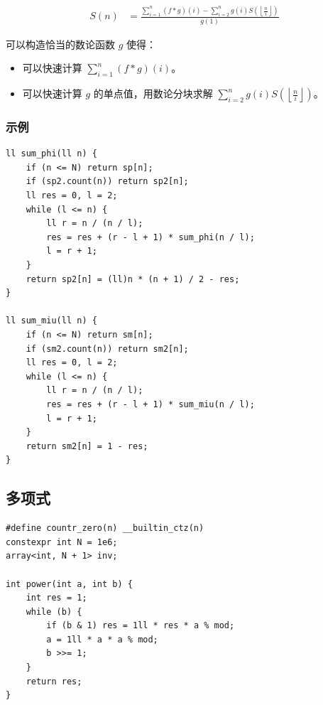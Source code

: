 \documentclass[UTF8, twoside]{ctexart}
\begin{document}
\begin{sloppypar}
$$
\begin{aligned}
    S(n) & = \frac{\sum_{i=1}^n (f * g)(i) - \sum_{i=2}^n g(i)S\left(\left\lfloor\frac{n}{i}\right\rfloor\right)}{g(1)}
\end{aligned}
$$

可以构造恰当的数论函数 $g$ 使得：

\begin{itemize}
   \item 可以快速计算 $\sum_{i=1}^n(f * g)(i)$。
   \item 可以快速计算 $g$ 的单点值，用数论分块求解 $\sum_{i=2}^ng(i)S\left(\left\lfloor\frac{n}{i}\right\rfloor\right)$。
\end{itemize}

\subsubsection{示例}

\begin{lstlisting}[style=cpp]
ll sum_phi(ll n) {
    if (n <= N) return sp[n];
    if (sp2.count(n)) return sp2[n];
    ll res = 0, l = 2;
    while (l <= n) {
        ll r = n / (n / l);
        res = res + (r - l + 1) * sum_phi(n / l);
        l = r + 1;
    }
    return sp2[n] = (ll)n * (n + 1) / 2 - res;
}

ll sum_miu(ll n) {
    if (n <= N) return sm[n];
    if (sm2.count(n)) return sm2[n];
    ll res = 0, l = 2;
    while (l <= n) {
        ll r = n / (n / l);
        res = res + (r - l + 1) * sum_miu(n / l);
        l = r + 1;
    }
    return sm2[n] = 1 - res;
}
\end{lstlisting}

\subsection{多项式}

\begin{lstlisting}[style=cpp]
#define countr_zero(n) __builtin_ctz(n)
constexpr int N = 1e6;
array<int, N + 1> inv;

int power(int a, int b) {
    int res = 1;
    while (b) {
        if (b & 1) res = 1ll * res * a % mod;
        a = 1ll * a * a % mod;
        b >>= 1;
    }
    return res;
}


\end{lstlisting}
\end{sloppypar}
\end{document}
